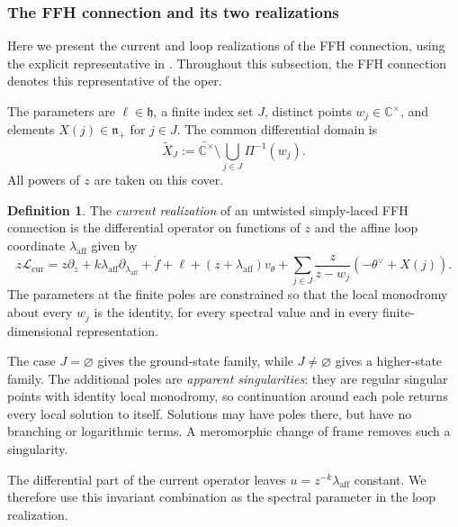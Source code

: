\documentclass[11pt,leqno]{amsart}
\numberwithin{equation}{section}
\theoremstyle{plain}
\theoremstyle{definition}
\newtheorem{definition}[theorem]{Definition}
\theoremstyle{plain}
\theoremstyle{definition}
\theoremstyle{remark}
\newcommand{\gh}{\mathfrak h}
\newcommand{\n}{\mathfrak n}
\begin{document}
\subsubsection{The FFH connection and its two realizations}
Here we present the current and loop realizations of the FFH connection, using the explicit representative in \cite[Theorem~6.18]{MR2024}.  Throughout this subsection, the FFH connection denotes this representative of the oper.

The parameters are $\ell\in\gh$, a finite index set $J$, distinct points $w_j\in\mathbb C^\times$, and elements $X(j)\in\n_+$ for $j\in J$.  The common differential domain is
\[
 \widetilde X_J
 :=\widetilde{\mathbb C^\times}\setminus\bigcup_{j\in J}\Pi^{-1}(w_j).
\]
All powers of $z$ are taken on this cover.

\begin{definition}\label{def:FFH-oper}
The \emph{current realization} of an untwisted simply-laced FFH connection is the differential operator on functions of $z$ and the affine loop coordinate $\lambda_{\mathrm{aff}}$ given by
\begin{equation}\label{eq:FFH-current-connection}
 z\mathcal L_{\mathrm{cur}}
 =z\partial_z+k\lambda_{\mathrm{aff}}\partial_{\lambda_{\mathrm{aff}}}
  +\mathring f+\ell+(z+\lambda_{\mathrm{aff}})v_\theta
  +\sum_{j\in J}\frac{z}{z-w_j}
       \left(-\theta^\vee+X(j)\right).
\end{equation}
The parameters at the finite poles are constrained so that the local monodromy about every $w_j$ is the identity, for every spectral value and in every finite-dimensional representation.
\end{definition}
The case $J=\varnothing$ gives the ground-state family, while $J\ne\varnothing$ gives a higher-state family.  The additional poles are \emph{apparent singularities}: they are regular singular points with identity local monodromy, so continuation around each pole returns every local solution to itself.  Solutions may have poles there, but have no branching or logarithmic terms.  A meromorphic change of frame removes such a singularity.

The differential part of the current operator leaves $u=z^{-k}\lambda_{\mathrm{aff}}$ constant.  We therefore use this invariant combination as the spectral parameter in the loop realization.
\end{document}
